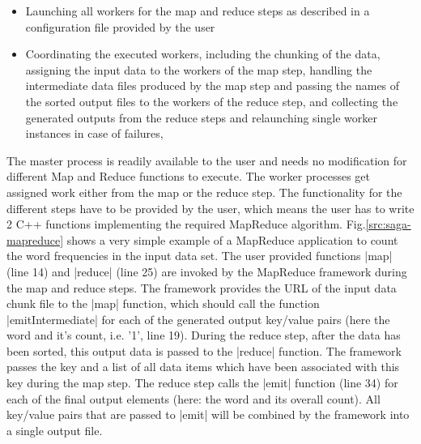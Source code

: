 \documentclass[conference,final]{IEEEtran}
\begin{document}
\begin{itemize}
\item Launching all workers for the map and reduce steps as described
  in a configuration file provided by the user 
\item Coordinating the executed workers, including the chunking of the
  data, assigning the input data to the workers of the map step,
  handling the intermediate data files produced by the map step and
  passing the names of the sorted output files to the workers of the
  reduce step, and collecting the generated outputs from the reduce
  steps and relaunching single worker instances in case of failures,
\end{itemize}

The master process is readily available to the user and needs no
modification for different Map and Reduce functions to execute.  The
worker processes get assigned work either from the map or the reduce
step. The functionality for the different steps have to be provided by
the user, which means the user has to write 2 C++ functions
implementing the required MapReduce algorithm.
Fig.\ref{src:saga-mapreduce} shows a very simple example of a
MapReduce application to count the word frequencies in the input data
set. The user provided functions |map| (line 14) and |reduce| (line
25) are invoked by the MapReduce framework during the map and reduce
steps. The framework provides the URL of the input data chunk file to
the |map| function, which should call the function |emitIntermediate|
for each of the generated output key/value pairs (here the word and
it's count, i.e. '1', line 19). During the reduce step, after the data
has been sorted, this output data is passed to the |reduce|
function. The framework passes the key and a list of all data items
which have been associated with this key during the map step. The
reduce step calls the |emit| function (line 34) for each of the final
output elements (here: the word and its overall count). All key/value
pairs that are passed to |emit| will be combined by the framework into
a single output file.


\end{document}
